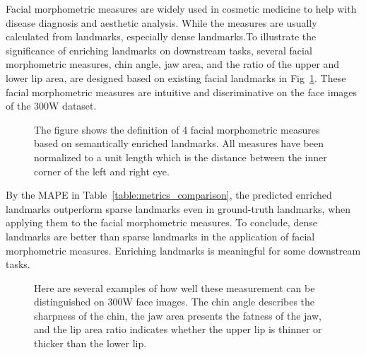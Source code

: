 \documentclass[letterpaper]{article} \usepackage{aaai23}  \usepackage{times}  \usepackage{helvet}  \usepackage{courier}  \usepackage[hyphens]{url}  \usepackage{graphicx} \urlstyle{rm} \def\UrlFont{\rm}  \usepackage{natbib}  \usepackage{caption} \frenchspacing  \setlength{\pdfpagewidth}{8.5in}  \setlength{\pdfpageheight}{11in}  \usepackage{algorithm}
\begin{document}
Facial morphometric measures are widely used in cosmetic medicine to help with disease diagnosis and aesthetic analysis.
While the measures are usually calculated from landmarks, especially dense landmarks.To illustrate the significance of enriching landmarks on downstream tasks, several facial morphometric measures, chin angle, jaw area, and the ratio of the upper and lower lip area, are designed based on existing facial landmarks in Fig~\ref{figure:metrics_definition}.
These facial morphometric measures are intuitive and discriminative on the face images of the 300W dataset. 








\begin{figure}[htp!]\centering
{}
\hfil
{}
\hfil
{}
\caption{The figure shows the definition of 4 facial morphometric measures based on semantically enriched landmarks. All measures have been normalized to a unit length which is the distance between the inner corner of the left and right eye.}
\label{figure:metrics_definition}
\end{figure}

By the MAPE in Table~\ref{table:metrics_comparison}, the predicted enriched landmarks outperform sparse landmarks even in ground-truth landmarks, when applying them to the facial morphometric measures.
To conclude, dense landmarks are better than sparse landmarks in the application of facial morphometric measures.
Enriching landmarks is meaningful for some downstream tasks.

\begin{figure}[H]
	\centering
	\subfigbottomskip=-2pt
	\subfigcapskip=-1pt



	\caption{Here are several examples of how well these measurement can be distinguished on 300W face images. The chin angle describes the sharpness of the chin, the jaw area presents the fatness of the jaw, and the lip area ratio indicates whether the upper lip is thinner or thicker than the lower lip. }
\end{figure}
\end{document}
